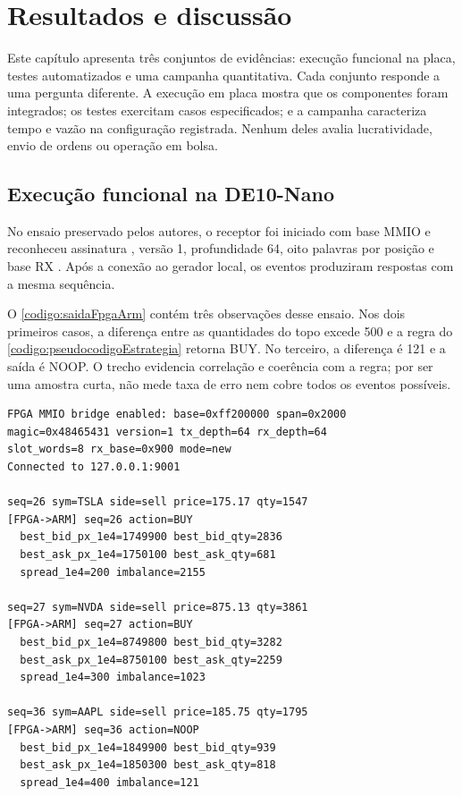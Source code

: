 
\chapter{Resultados e discussão}\label{cap:resultados}

Este capítulo apresenta três conjuntos de evidências: execução funcional na placa, testes automatizados e uma campanha quantitativa. Cada conjunto responde a uma pergunta diferente. A execução em placa mostra que os componentes foram integrados; os testes exercitam casos especificados; e a campanha caracteriza tempo e vazão na configuração registrada. Nenhum deles avalia lucratividade, envio de ordens ou operação em bolsa.

\section{Execução funcional na DE10-Nano}\label{subsec:execucaoFuncionalDe10}

No ensaio preservado pelos autores, o receptor foi iniciado com base MMIO  e reconheceu assinatura , versão 1, profundidade 64, oito palavras por posição e base RX . Após a conexão ao gerador local, os eventos produziram respostas com a mesma sequência.

O \autoref{codigo:saidaFpgaArm} contém três observações desse ensaio. Nos dois primeiros casos, a diferença entre as quantidades do topo excede 500 e a regra do \autoref{codigo:pseudocodigoEstrategia} retorna BUY. No terceiro, a diferença é 121 e a saída é NOOP. O trecho evidencia correlação e coerência com a regra; por ser uma amostra curta, não mede taxa de erro nem cobre todos os eventos possíveis.

\begin{sourcecode}[htb]
\caption{Trecho da saída do receptor com respostas FPGA--ARM}
\label{codigo:saidaFpgaArm}
\begin{lstlisting}[frame=single]
FPGA MMIO bridge enabled: base=0xff200000 span=0x2000
magic=0x48465431 version=1 tx_depth=64 rx_depth=64
slot_words=8 rx_base=0x900 mode=new
Connected to 127.0.0.1:9001

seq=26 sym=TSLA side=sell price=175.17 qty=1547
[FPGA->ARM] seq=26 action=BUY
  best_bid_px_1e4=1749900 best_bid_qty=2836
  best_ask_px_1e4=1750100 best_ask_qty=681
  spread_1e4=200 imbalance=2155

seq=27 sym=NVDA side=sell price=875.13 qty=3861
[FPGA->ARM] seq=27 action=BUY
  best_bid_px_1e4=8749800 best_bid_qty=3282
  best_ask_px_1e4=8750100 best_ask_qty=2259
  spread_1e4=300 imbalance=1023

seq=36 sym=AAPL side=sell price=185.75 qty=1795
[FPGA->ARM] seq=36 action=NOOP
  best_bid_px_1e4=1849900 best_bid_qty=939
  best_ask_px_1e4=1850300 best_ask_qty=818
  spread_1e4=400 imbalance=121
\end{lstlisting}
\end{sourcecode}

